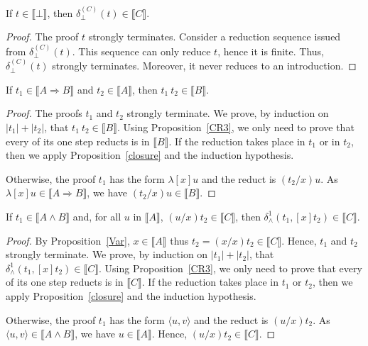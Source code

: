 \documentclass[screen, sigconf,authorversion,nonacm]{acmart}
\theoremstyle{acmdefinition}
\numberwithin{equation}{section}
\newcommand\abstr[1]{[#1]}
\newcommand\elimbot[1]{\delta^{(#1)}_{\bot}}
\newcommand\elimand{\delta_{\wedge}}
\newcommand\pair[2]{\langle #1, #2 \rangle}
\begin{document}
\begin{proposition}[Adequacy of $\elimbot{C}$]
\label{elimbot}
If $t \in \llbracket \bot \rrbracket$, 
then $\elimbot{C}(t) \in \llbracket C \rrbracket$.
\end{proposition}

\begin{proof}
The proof $t$ strongly terminates.  Consider a reduction sequence
issued from $\elimbot{C}(t)$.  This sequence can only reduce $t$, hence it
is finite.  Thus, $\elimbot{C}(t)$ strongly terminates.  Moreover, it
never reduces to an introduction.
\qedhere
\end{proof}

\begin{proposition}
\label{application}
If $t_1 \in \llbracket A \Rightarrow B \rrbracket$ and $t_2 \in
\llbracket A \rrbracket$, then $t_1~t_2 \in \llbracket B
\rrbracket$.
\end{proposition}

\begin{proof}
The proofs $t_1$ and $t_2$ strongly terminate. We prove, by induction
on $|t_1| + |t_2|$, that $t_1~t_2 \in \llbracket B \rrbracket$. Using
Proposition~\ref{CR3}, we only need to prove that every of its one
step reducts is in $\llbracket B \rrbracket$.  If the reduction takes
place in $t_1$ or in $t_2$, then we apply Proposition~\ref{closure}
and the induction hypothesis.

Otherwise, the proof $t_1$ has the form $\lambda \abstr{x}u$ and the reduct
is $(t_2/x)u$.  As $\lambda \abstr{x}u \in \llbracket A \Rightarrow B
\rrbracket$, we have $(t_2/x)u \in \llbracket B \rrbracket$.
\qedhere
\end{proof}

\begin{proposition}[Adequacy of $\elimand^1$]
\label{elimand1}
If $t_1 \in \llbracket A \wedge B \rrbracket$ and,
for all $u$ in $\llbracket A \rrbracket$,
$(u/x)t_2 \in \llbracket C \rrbracket $, 
then $\elimand^1(t_1, \abstr{x}t_2) \in \llbracket C \rrbracket$.
\end{proposition}

\begin{proof}
By Proposition~\ref{Var}, $x \in \llbracket A \rrbracket$
thus $t_2 = (x/x)t_2 \in \llbracket C
\rrbracket$.  Hence, $t_1$ and $t_2$ strongly terminate.  We prove, by
induction on $|t_1| + |t_2|$, that $\elimand^1(t_1, \abstr{x}t_2)
\in \llbracket C \rrbracket$.  Using Proposition~\ref{CR3}, we only
need to prove that every of its one step reducts is in $\llbracket C
\rrbracket$.  If the reduction takes place in $t_1$ or $t_2$, then we
apply Proposition~\ref{closure} and the induction hypothesis.

Otherwise, the proof $t_1$ has the form $\pair{u}{v}$ and the
reduct is $(u/x)t_2$.  As $\pair{u}{v} \in \llbracket A
\wedge B \rrbracket$, we have $u \in \llbracket A \rrbracket$.
Hence, $(u/x)t_2 \in \llbracket C \rrbracket$.
\qedhere
\end{proof}
\end{document}
